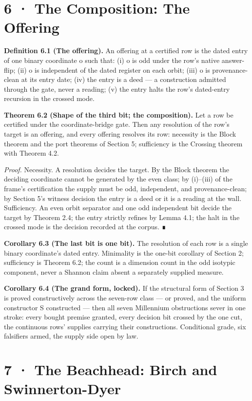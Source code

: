 \documentclass[10pt,twocolumn]{article}
\begin{document}
\section{6 · The Composition: The
Offering}\label{the-composition-the-offering}

\textbf{Definition 6.1 (The offering).} An offering at a certified row
is the dated entry of one binary coordinate o such that: (i) o is odd
under the row's native answer-flip; (ii) o is independent of the dated
register on each orbit; (iii) o is provenance-clean at its entry date;
(iv) the entry is a deed --- a construction admitted through the gate,
never a reading; (v) the entry halts the row's dated-entry recursion in
the crossed mode.

\textbf{Theorem 6.2 (Shape of the third bit; the composition).} Let a
row be certified under the coordinate-bridge gate. Then any resolution
of the row's target is an offering, and every offering resolves its row:
necessity is the Block theorem and the port theorems of Section 5;
sufficiency is the Crossing theorem with Theorem 4.2.

\emph{Proof.} Necessity. A resolution decides the target. By the Block
theorem the deciding coordinate cannot be generated by the even class;
by (i)--(iii) of the frame's certification the supply must be odd,
independent, and provenance-clean; by Section 5's witness decision the
entry is a deed or it is a reading at the wall. Sufficiency. An even
orbit separator and one odd independent bit decide the target by Theorem
2.4; the entry strictly refines by Lemma 4.1; the halt in the crossed
mode is the decision recorded at the corpus. ∎

\textbf{Corollary 6.3 (The last bit is one bit).} The resolution of each
row is a single binary coordinate's dated entry. Minimality is the
one-bit corollary of Section 2; sufficiency is Theorem 6.2; the count is
a dimension count in the odd isotypic component, never a Shannon claim
absent a separately supplied measure.

\textbf{Corollary 6.4 (The grand form, locked).} If the structural form
of Section 3 is proved constructively across the seven-row class --- or
proved, and the uniform constructor S constructed --- then all seven
Millennium obstructions sever in one stroke: every bought premise
granted, every decision bit crossed by the one cut, the continuous rows'
supplies carrying their constructions. Conditional grade, six falsifiers
armed, the supply side open by law.

\section{7 · The Beachhead: Birch and
Swinnerton-Dyer}\label{the-beachhead-birch-and-swinnerton-dyer}
\end{document}
